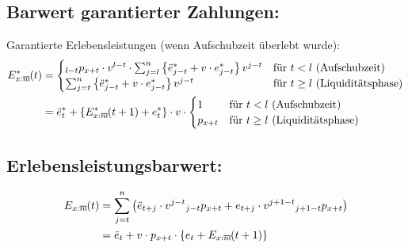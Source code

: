 \documentclass[a4paper,10pt]{article}
\makeatletter
\newcommand{\xn}{{\act[x]{n}}}
\DeclareRobustCommand{\act}[2][]{%
\def\arraystretch{0}%
\setlength\arraycolsep{0.5pt}%
\setlength\arrayrulewidth{0.5pt}%
\setbox0=\hbox{$\scriptstyle#1\ifx#1\empty{asdf}\else:\fi#2$}%
\begin{array}[b]{*2{@{}>{\scriptstyle}c}|}
\cline{2-2}%
\rule[1.25pt]{0pt}{\ht0}%
#1\ifx#1\empty\else:\fi & #2%
\end{array}%
}
\makeatother
\begin{document}
\subsection{Barwert garantierter Zahlungen:}
Garantierte Erlebensleistungen (wenn Aufschubzeit überlebt wurde):
\begin{align*}
 E^{*}_\xn(t) &= \begin{cases}
		    {}_{l-t}p_{x+t} \cdot v^{l-t} \cdot \sum_{j=l}^{n} \left\{\ddot{e}^{*}_{j-t}+ v\cdot e^*_{j-t}\right\} v^{j-t} & \text{für $t<l$ (Aufschubzeit)}\\
		    \sum_{j=t}^{n} \left\{\ddot{e}^{*}_{j-t}+ v\cdot e^*_{j-t}\right\} v^{j-t} & \text{für $t\ge l$ (Liquiditätsphase)}
                 \end{cases}\\
   &= \ddot{e}_t^{*} + \left\{E^{*}_\xn(t+1) + e_t^*\right\}\cdot v \cdot \begin{cases}
	    1 & \text{für $t<l$ (Aufschubzeit)}\\
            p_{x+t} & \text{für $t\ge l$ (Liquiditätsphase)}
       \end{cases}
\end{align*}


\subsection{Erlebensleistungsbarwert:}
\begin{align*}
E_\xn(t) &= \sum_{j=t}^n \left(\ddot{e}_{t+j} \cdot v^{j-t}  {}_{j-t}p_{x+t} + e_{t+j} \cdot v^{j+1-t} {}_{j+1-t}p_{x+t} \right)\\
	  &= \ddot{e}_{t} + v \cdot p_{x+t} \cdot \left\{ e_t + E_\xn(t+1)\right\}\\
\end{align*}

\end{document}
